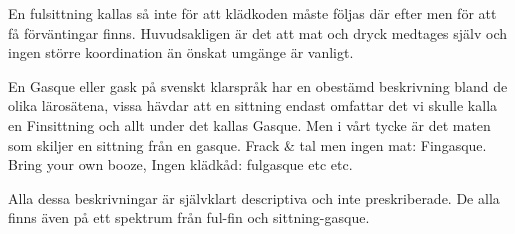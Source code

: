 
En fulsittning kallas så inte för att klädkoden måste följas där efter men för att få förväntingar finns. Huvudsakligen är det att mat och dryck medtages själv och ingen större koordination än önskat umgänge är vanligt. 


En Gasque eller gask på svenskt klarspråk har en obestämd beskrivning bland de olika lärosätena, vissa hävdar att en sittning endast omfattar det vi skulle kalla en Finsittning och allt under det kallas Gasque. Men i vårt tycke är det maten som skiljer en sittning från en gasque. Frack \& tal men ingen mat: Fingasque. Bring your own booze, Ingen klädkåd: fulgasque etc etc.

Alla dessa beskrivningar är självklart descriptiva och inte preskriberade. De alla finns även på ett spektrum från ful-fin och sittning-gasque.

\newpage